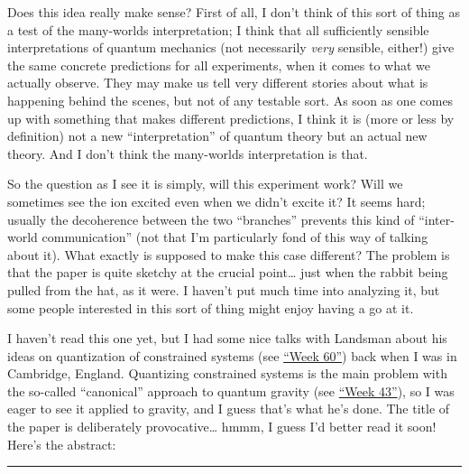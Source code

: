 \documentclass{article}
\def\tightlist{}
\renewcommand{\texttt}[1]{%
  \begingroup
  \ttfamily
  \begingroup\lccode`~=`/\lowercase{\endgroup\def~}{/\discretionary{}{}{}}%
  \begingroup\lccode`~=`[\lowercase{\endgroup\def~}{[\discretionary{}{}{}}%
  \begingroup\lccode`~=`.\lowercase{\endgroup\def~}{.\discretionary{}{}{}}%
  \catcode`/=\active\catcode`[=\active\catcode`.=\active
  \scantokens{#1\noexpand}%
  \endgroup
}
\begin{document}
Does this idea really make sense? First of all, I don't think of this
sort of thing as a test of the many-worlds interpretation; I think that
all sufficiently sensible interpretations of quantum mechanics (not
necessarily \emph{very} sensible, either!) give the same concrete
predictions for all experiments, when it comes to what we actually
observe. They may make us tell very different stories about what is
happening behind the scenes, but not of any testable sort. As soon as
one comes up with something that makes different predictions, I think it
is (more or less by definition) not a new ``interpretation'' of quantum
theory but an actual new theory. And I don't think the many-worlds
interpretation is that.

So the question as I see it is simply, will this experiment work? Will
we sometimes see the ion excited even when we didn't excite it? It seems
hard; usually the decoherence between the two ``branches'' prevents this
kind of ``inter-world communication'' (not that I'm particularly fond of
this way of talking about it). What exactly is supposed to make this
case different? The problem is that the paper is quite sketchy at the
crucial point\ldots{} just when the rabbit being pulled from the hat, as
it were. I haven't put much time into analyzing it, but some people
interested in this sort of thing might enjoy having a go at it.


I haven't read this one yet, but I had some nice talks with Landsman
about his ideas on quantization of constrained systems (see
\protect\hyperlink{week60}{``Week 60''}) back when I was in Cambridge,
England. Quantizing constrained systems is the main problem with the
so-called ``canonical'' approach to quantum gravity (see
\protect\hyperlink{week43}{``Week 43''}), so I was eager to see it
applied to gravity, and I guess that's what he's done. The title of the
paper is deliberately provocative\ldots{} hmmm, I guess I'd better read
it soon! Here's the abstract:

\begin{center}\rule{0.5\linewidth}{0.5pt}\end{center}
\end{document}
